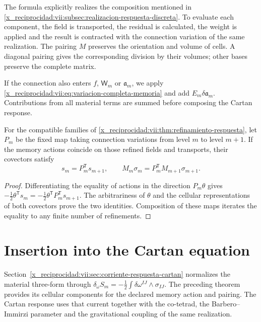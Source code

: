 The formula explicitly realizes the composition mentioned in
\ref{x_reciprocidad:vii:subsec:realizacion-respuesta-discreta}. To evaluate each
component, the field is transported, the residual is calculated, the
weight is applied and the result is contracted with the connection variation of the same realization.
The pairing \(M\) preserves the orientation and volume of cells.
A diagonal pairing gives the corresponding division by their
volumes; other bases preserve the complete matrix.

If the connection also enters \(f\), \(\mathsf W_m\)
or \(\mathfrak a_m\), we apply
\eqref{x_reciprocidad:vii:eq:variacion-completa-memoria} and add
\(E_m\delta\mathfrak a_m\). Contributions from all
material terms are summed before composing the Cartan response.

\begin{corollary}
\label{x_reciprocidad:vii:cor:refinamiento-corriente-conexion}
For the compatible families of
\ref{x_reciprocidad:vii:thm:refinamiento-respuesta}, let \(P_m\) be the fixed map
taking connection variations from level \(m\) to level
\(m+1\). If the memory actions coincide on those refined fields
and transports, their covectors satisfy
\[
 s_m=P_m^{\mathsf T}s_{m+1},\qquad
 M_m\sigma_m=P_m^{\mathsf T}M_{m+1}\sigma_{m+1}.
\]
\end{corollary}

\begin{proof}
Differentiating the equality of actions in the direction
\(P_m\theta\) gives
\(-\tfrac12\theta^{\mathsf T}s_m
 =-\tfrac12\theta^{\mathsf T}P_m^{\mathsf T}s_{m+1}\).
The arbitrariness of \(\theta\) and the cellular representations
of both covectors prove the two identities. Composition of
these maps iterates the equality to any finite number of refinements.
\end{proof}

\section{Insertion into the Cartan equation}

Section~\ref{x_reciprocidad:vii:sec:corriente-respuesta-cartan} normalizes the
material three-form through
\(\delta_\omega S_m=-\tfrac12\int\delta\omega^{IJ}\wedge
\sigma_{IJ}\). The preceding theorem provides its cellular
components for the declared memory action and pairing.
The Cartan response uses that current together with the co-tetrad,
the Barbero--Immirzi parameter and the gravitational coupling of the
same realization.

